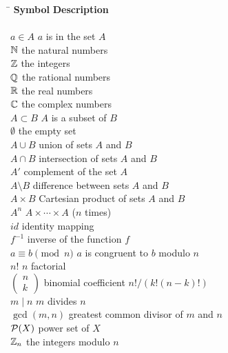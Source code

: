  
\begin{tabbing}
\hspace{1.9775in} \= \kill
{\bf Symbol}  \>  {\bf Description} \\
     \mbox{\hspace*{1in}} \\
$a \in A$ \>  $a$ is in the set $A$ \\
${\Bbb N}$ \>  the natural numbers \\
${\Bbb Z}$ \>  the integers \\
${\Bbb Q}$ \>  the rational numbers \\
${\Bbb R}$ \>  the real numbers \\
${\Bbb C}$ \>  the complex numbers \\
$A \subset B$ \>  $A$ is a subset of $B$ \\
$\emptyset$ \>  the empty set \\
$A \cup B$ \>  union of sets $A$ and $B$ \\
$A \cap B$ \>  intersection of sets $A$ and $B$ \\
$A'$ \>  complement of the  set $A$ \\
$A \setminus B$ \>  difference between sets $A$ and $B$ \\
$A \times B$ \>  Cartesian product of sets $A$ and $B$ \\
$A^n$ \>  $A \times \cdots \times A$ ($n$ times) \\
$id$ \>  identity mapping \\
$f^{-1}$ \>  inverse of the function $f$	\\
$a \equiv b \pmod{n}$ \>  $a$ is congruent to $b$ modulo $n$ \\
$n!$ \>  $n$ factorial \\
$\left(\begin{array}{c}n \\ k \end{array} \right)$ \>  binomial
     coefficient $n!/(k! (n-k)!)$ \\
$m \mid n$ \>  $m$ divides $n$ \\
$\gcd(m, n)$ \>  greatest common divisor of $m$ and $n$ \\
${\cal P}(X)$ \>  power set of $X$ \\
${\Bbb Z}_n$ \>  the integers modulo $n$ \\
\end{tabbing} \clearpage
